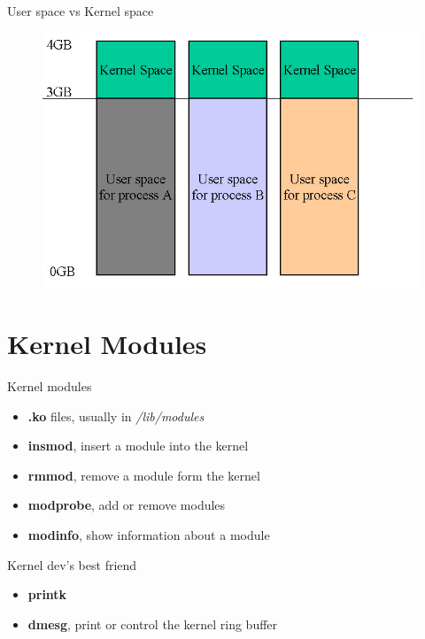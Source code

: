 \documentclass{workshop}
\begin{document}
\begin{frame}{User space vs Kernel space}

\begin{figure}
  \includegraphics[scale=0.4]{img/user-kernel-space.jpg}
\end{figure}

\end{frame}


\section{Kernel Modules}


\begin{frame}{Kernel modules}

\begin{itemize}
	\item {\bf .ko} files, usually in \emph{/lib/modules}
	\item {\bf insmod}, insert a module into the kernel
	\item {\bf rmmod}, remove a module form the kernel
	\item {\bf modprobe}, add or remove modules
	\item {\bf modinfo}, show information about a module
\end{itemize}
\end{frame}

\begin{frame}{Kernel dev's best friend}

\begin{itemize}
	\item {\bf printk}
	\item {\bf dmesg}, print or control the kernel ring buffer
\end{itemize}
\end{frame}
\end{document}
